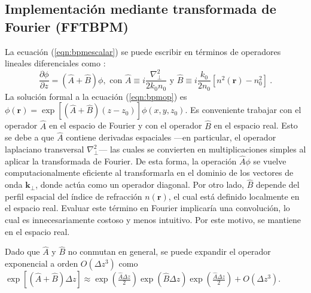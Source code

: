 \subsection{Implementación mediante transformada de Fourier (FFTBPM)}
La ecuación (\ref{eqn:bpmescalar}) se puede escribir en términos de operadores lineales diferenciales como \citep{bpm}: 
\begin{equation}
	\frac{\partial \phi}{\partial z}  = \left(\hat{A} + \hat{B}\right)\phi, \text{ con } \hat{A} \equiv i\frac{\nabla^2_\perp}{2k_0n_0}\text{ y } \hat{B} \equiv i\frac{k_0}{2n_0}\left[n^2(\textbf{r})-n_0^2\right] \ . \label{eqn:bpmop}
\end{equation}
La solución formal a la ecuación (\ref{eqn:bpmop}) es $\phi(\textbf{r}) = \exp\left[\left(\hat{A} + \hat{B}\right)(z-z_0)\right]\phi(x, y, z_0)$. Es conveniente trabajar con el operador \( \hat{A} \) en el espacio de Fourier y con el operador \( \hat{B} \) en el espacio real. Esto se debe a que \( \hat{A} \) contiene derivadas espaciales —en particular, el operador laplaciano transversal \( \nabla^2_\perp \)— las cuales se convierten en multiplicaciones simples al aplicar la transformada de Fourier. De esta forma, la operación \( \hat{A} \phi \) se vuelve computacionalmente eficiente al transformarla en el dominio de los vectores de onda \( \textbf{k}_\perp \), donde actúa como un operador diagonal. Por otro lado, \( \hat{B} \) depende del perfil espacial del índice de refracción \( n(\textbf{r}) \), el cual está definido localmente en el espacio real. Evaluar este término en Fourier implicaría una convolución, lo cual es innecesariamente costoso y menos intuitivo. Por este motivo, se mantiene en el espacio real. 

Dado que $\hat{A}$ y $\hat{B}$ no conmutan en general, se puede expandir el operador exponencial a orden $O(\Delta z ^3)$ como $\exp\left[\left(\hat{A} + \hat{B}\right)\Delta z \right] \approx \exp\left(\frac{\hat{A}\Delta z}{2} \right)\exp\left(\hat{B}\Delta z \right)\exp\left(\frac{\hat{A}\Delta z}{2} \right) + O(\Delta z ^3)$.

